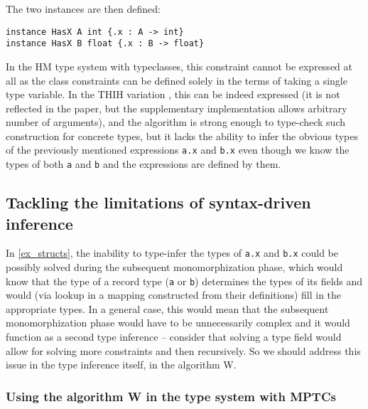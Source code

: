 The two instances are then defined:

\begin{lstlisting}
instance HasX A int {.x : A -> int}
instance HasX B float {.x : B -> float}
\end{lstlisting}

In the HM type system with typeclasses, this constraint cannot be expressed at all as the class constraints can be defined solely in the terms of taking a single type variable. In the THIH variation \cite{jones1999typing}, this can be indeed expressed (it is not reflected in the paper, but the supplementary implementation allows arbitrary number of arguments), and the algorithm is strong enough to type-check such construction for concrete types, but it lacks the ability to infer the obvious types of the previously mentioned expressions \lstinline{a.x} and \lstinline{b.x} even though we know the types of both \lstinline{a} and \lstinline{b} and the expressions are defined by them.

\subsection{Tackling the limitations of syntax-driven inference}
\label{sec:tackle}

In \cref{ex_structs}, the inability to type-infer the types of \lstinline{a.x} and \lstinline{b.x} could be possibly solved during the subsequent monomorphization phase, which would know that the type of a record type (\lstinline{a} or \lstinline{b}) determines the types of its fields and would (via lookup in a mapping constructed from their definitions) fill in the appropriate types. In a general case, this would mean that the subsequent monomorphization phase would have to be unnecessarily complex and it would function as a second type inference -- consider that solving a type field would allow for solving more constraints and then recursively. So we should address this issue in the type inference itself, in the algorithm W.

\subsubsection{Using the algorithm W in the type system with MPTCs}

